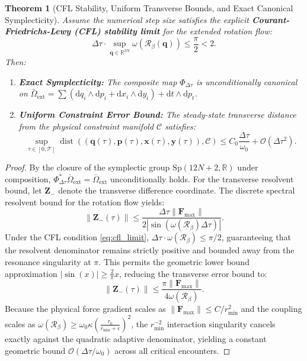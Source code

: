 \documentclass[11pt,a4paper,reqno]{article}
\theoremstyle{plain}
\newtheorem{theorem}{Theorem}[section]
\theoremstyle{definition}
\theoremstyle{remark}
\numberwithin{equation}{section}
\begin{document}
\begin{theorem}[CFL Stability, Uniform Transverse Bounds, and Exact Canonical Symplecticity]
\label{thm:adaptive_bound}
Assume the numerical step size satisfies the explicit \textbf{Courant-Friedrichs-Lewy (CFL) stability limit} for the extended rotation flow:
\begin{equation}
\Delta \tau \cdot \sup_{\bm{q} \in \mathbb{R}^{3N}} \omega(\mathcal{R}_\beta(\bm{q})) \le \frac{\pi}{2} < 2.
\label{eq:cfl_limit}
\end{equation}
Then:
\begin{enumerate}
    \item \textbf{Exact Symplecticity:} The composite map $\Phi_{\Delta \tau}$ is unconditionally canonical on $\bar{\Omega}_{\mathrm{ext}} = \sum (\mathrm{d}q_i \wedge \mathrm{d}p_i + \mathrm{d}x_i \wedge \mathrm{d}y_i) + \mathrm{d}t \wedge \mathrm{d}p_t$.
    \item \textbf{Uniform Constraint Error Bound:} The steady-state transverse distance from the physical constraint manifold $\mathcal{C}$ satisfies:
    \begin{equation}
    \sup_{\tau \in [0, \mathcal{T}]} \operatorname{dist}((\bm{q}(\tau), \bm{p}(\tau), \bm{x}(\tau), \bm{y}(\tau)), \mathcal{C}) \le C_0 \frac{\Delta \tau}{\omega_0} + \mathcal{O}(\Delta \tau^2).
    \label{eq:uniform_bound}
    \end{equation}
\end{enumerate}
\end{theorem}

\begin{proof}
By the closure of the symplectic group $\mathrm{Sp}(12N+2, \mathbb{R})$ under composition, $\Phi_{\Delta \tau}^* \bar{\Omega}_{\mathrm{ext}} = \bar{\Omega}_{\mathrm{ext}}$ unconditionally holds. For the transverse resolvent bound, let $\bm{Z}_-$ denote the transverse difference coordinate. The discrete spectral resolvent bound for the rotation flow yields:
\begin{equation}
\|\bm{Z}_-(\tau)\| \le \frac{\Delta \tau \|\bm{F}_{\max}\|}{2 |\sin(\omega(\mathcal{R}_\beta) \Delta \tau)|}.
\label{eq:resolvent_bound}
\end{equation}
Under the CFL condition \eqref{eq:cfl_limit}, $\Delta \tau \cdot \omega(\mathcal{R}_\beta) \le \pi/2$, guaranteeing that the resolvent denominator remains strictly positive and bounded away from the resonance singularity at $\pi$. This permits the geometric lower bound approximation $|\sin(x)| \ge \frac{2}{\pi}x$, reducing the transverse error bound to:
\begin{equation}
\|\bm{Z}_-(\tau)\| \le \frac{\pi \|\bm{F}_{\max}\|}{4 \omega(\mathcal{R}_\beta)}.
\end{equation}
Because the physical force gradient scales as $\|\bm{F}_{\max}\| \le C/r_{\min}^2$ and the coupling scales as $\omega(\mathcal{R}_\beta) \ge \omega_0 \kappa \left( \frac{r_0}{r_{\min} + \epsilon} \right)^2$, the $r_{\min}^{-2}$ interaction singularity cancels exactly against the quadratic adaptive denominator, yielding a constant geometric bound $\mathcal{O}(\Delta \tau / \omega_0)$ across all critical encounters.
\end{proof}
\end{document}
